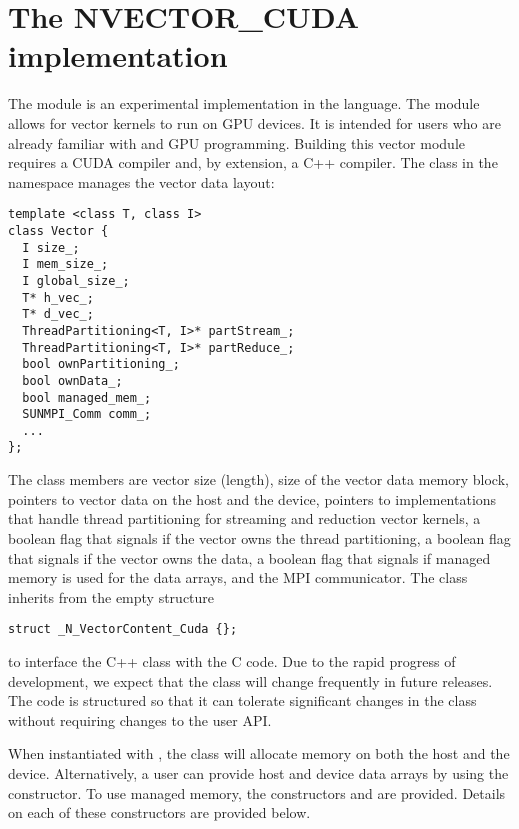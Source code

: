 %
\section{The NVECTOR\_CUDA implementation}\label{ss:nvec_cuda}

The {\nveccuda} module is an experimental {\nvector} implementation in the {\cuda} language.
The module allows for {\sundials} vector kernels to run on GPU devices. It is intended for users
who are already familiar with {\cuda} and GPU programming. Building this vector
module requires a CUDA compiler and, by extension, a C++ compiler. The class 
in the namespace  manages the vector data layout:

\begin{verbatim}
template <class T, class I>
class Vector {
  I size_;
  I mem_size_;
  I global_size_;
  T* h_vec_;
  T* d_vec_;
  ThreadPartitioning<T, I>* partStream_;
  ThreadPartitioning<T, I>* partReduce_;
  bool ownPartitioning_;
  bool ownData_;
  bool managed_mem_;
  SUNMPI_Comm comm_;
  ...
};
\end{verbatim}

The class members are vector size (length), size of the vector data memory
block, pointers to vector data on the host and the device, pointers
to  implementations that handle thread partitioning for
streaming and reduction vector kernels, a boolean flag that signals if the
vector owns the thread partitioning, a boolean flag that signals if the vector
owns the data, a boolean flag that signals if managed memory is used for the
data arrays, and the MPI communicator. The class  inherits from the
empty structure
\begin{verbatim}
struct _N_VectorContent_Cuda {};
\end{verbatim}
to interface the C++ class with the {\nvector} C code. Due to the rapid progress
of {\cuda} development, we expect that the  class will
change frequently in future {\sundials} releases. The code is structured so that
it can tolerate significant changes in the  class without
requiring changes to the user API.

When instantiated with , the class  will allocate
memory on both the host and the device. Alternatively, a user can provide host
and device data arrays by using the  constructor. To use {\cuda}
managed memory, the constructors  and \newline
{} are provided. Details on each of these constructors
are provided below.

